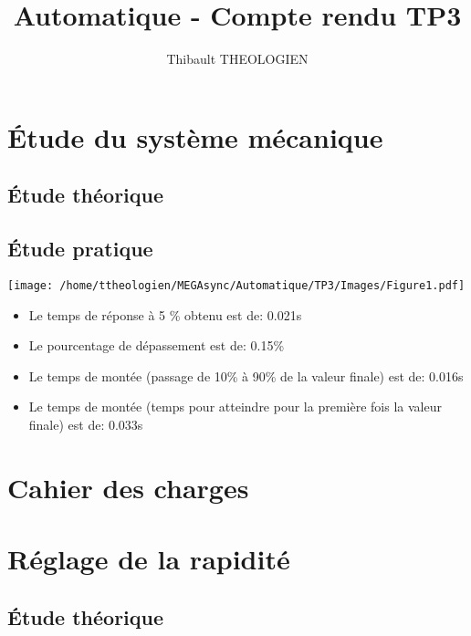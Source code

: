 \documentclass[a4paper,12pt]{article}
\title{Automatique - Compte rendu TP3}
\author{Thibault THEOLOGIEN}
\begin{document}
	\maketitle
	\tableofcontents
	\newpage

	\section{Étude du système mécanique}
		\subsection{Étude théorique}
			\newpage

		\subsection{Étude pratique}
			\begin{center}
				\texttt{[image: /home/ttheologien/MEGAsync/Automatique/TP3/Images/Figure1.pdf]}
			\end{center}
			\begin{itemize}
				\item Le temps de réponse à 5 \% obtenu est de: 0.021s
				\item Le pourcentage de dépassement est de: 0.15\%
				\item Le temps de montée (passage de 10\% à 90\% de la valeur finale) est de: 0.016s
				\item Le temps de montée (temps pour atteindre pour la première fois la valeur finale) est de: 0.033s
			\end{itemize}
	\newpage

	\section{Cahier des charges}
		\newpage

	\section{Réglage de la rapidité}
		\subsection{Étude théorique}
			\newpage
			
\end{document}
